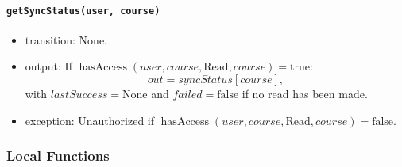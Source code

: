 \documentclass[12pt, titlepage]{article}
\begin{document}
\paragraph{\texttt{getSyncStatus(user, course)}}
\begin{itemize}
    \item transition: None.
    \item output: If $\operatorname{hasAccess}(user,course,\text{Read},course)=\text{true}$:
    \[
    out=\mathit{syncStatus}[course],
    \]
    with $\mathit{lastSuccess}=\text{None}$ and $\mathit{failed}=\text{false}$ if no read has been made.
    \item exception: Unauthorized if $\operatorname{hasAccess}(user,course,\text{Read},course)=\text{false}$.
\end{itemize}

\subsubsection{Local Functions}
\end{document}
